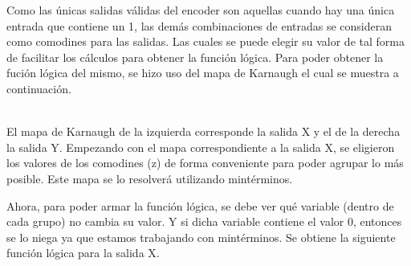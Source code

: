Como las \'unicas salidas v\'alidas del encoder son aquellas cuando hay una \'unica entrada que contiene un 1, las dem\'as combinaciones de entradas se consideran como comodines para las salidas. Las cuales
se puede elegir su valor de tal forma de facilitar los cálculos para obtener la funci\'on l\'ogica.
Para poder obtener la fuci\'on l\'ogica del mismo, se hizo uso del mapa de Karnaugh el cual se muestra
a continuación.
\\
\begin{Karnaugh}
\end{Karnaugh}
\begin{Karnaugh}
\end{Karnaugh}
\\
El mapa de Karnaugh de la izquierda corresponde la salida X y el de la derecha la salida Y.
Empezando con el mapa correspondiente a la salida X, se eligieron los valores de los comodines (z) de forma conveniente para poder agrupar lo m\'as posible. Este mapa se lo resolver\'a utilizando mint\'erminos.

\begin{center}
\begin{Karnaugh}
\end{Karnaugh}
\end{center}

Ahora, para poder armar la funci\'on l\'ogica, se debe ver qu\'e variable (dentro de cada grupo) no cambia su valor. Y si dicha variable contiene el valor 0, entonces se lo niega ya que estamos trabajando con mint\'erminos. Se obtiene la siguiente funci\'on l\'ogica para la salida X.

